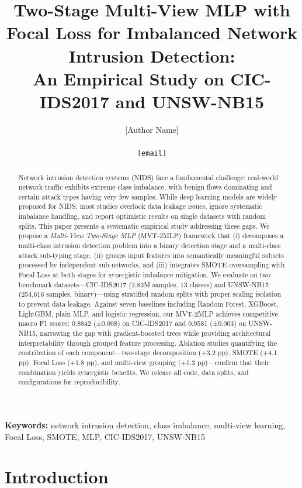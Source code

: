 \documentclass[12pt]{article}
\title{\textbf{Two-Stage Multi-View MLP with Focal Loss for Imbalanced Network Intrusion Detection:\\
An Empirical Study on CIC-IDS2017 and UNSW-NB15}}
\author{
  [Author Name]\\
  [Affiliation]\\
  \texttt{[email]}
}
\date{}
\begin{document}
\maketitle

\begin{abstract}
Network intrusion detection systems (NIDS) face a fundamental challenge: real-world network traffic exhibits extreme class imbalance, with benign flows dominating and certain attack types having very few samples. While deep learning models are widely proposed for NIDS, most studies overlook data leakage issues, ignore systematic imbalance handling, and report optimistic results on single datasets with random splits. This paper presents a systematic empirical study addressing these gaps. We propose a \emph{Multi-View Two-Stage MLP} (MVT-2MLP) framework that (i) decomposes a multi-class intrusion detection problem into a binary detection stage and a multi-class attack sub-typing stage, (ii) groups input features into semantically meaningful subsets processed by independent sub-networks, and (iii) integrates SMOTE oversampling with Focal Loss at both stages for synergistic imbalance mitigation. We evaluate on two benchmark datasets---CIC-IDS2017 (2.83M samples, 13 classes) and UNSW-NB15 (254,616 samples, binary)---using stratified random splits with proper scaling isolation to prevent data leakage. Against seven baselines including Random Forest, XGBoost, LightGBM, plain MLP, and logistic regression, our MVT-2MLP achieves competitive macro F1 scores: 0.8842 (±0.008) on CIC-IDS2017 and 0.9581 (±0.003) on UNSW-NB15, narrowing the gap with gradient-boosted trees while providing architectural interpretability through grouped feature processing. Ablation studies quantifying the contribution of each component---two-stage decomposition (+3.2 pp), SMOTE (+4.1 pp), Focal Loss (+1.8 pp), and multi-view grouping (+1.3 pp)---confirm that their combination yields synergistic benefits. We release all code, data splits, and configurations for reproducibility.
\end{abstract}

\noindent\textbf{Keywords:} network intrusion detection, class imbalance, multi-view learning, Focal Loss, SMOTE, MLP, CIC-IDS2017, UNSW-NB15

\section{Introduction}
\label{sec:intro}
\end{document}

